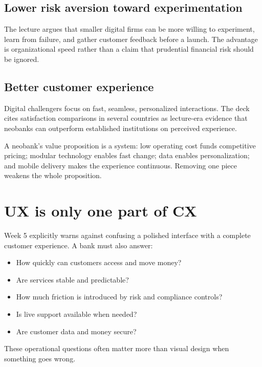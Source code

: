 \subsection{Lower risk aversion toward experimentation}

The lecture argues that smaller digital firms can be more willing to experiment, learn from failure, and gather customer feedback before a launch. The advantage is organizational speed rather than a claim that prudential financial risk should be ignored.

\subsection{Better customer experience}

Digital challengers focus on fast, seamless, personalized interactions. The deck cites satisfaction comparisons in several countries as lecture-era evidence that neobanks can outperform established institutions on perceived experience.

\begin{keyidea}
A neobank's value proposition is a system: low operating cost funds competitive pricing; modular technology enables fast change; data enables personalization; and mobile delivery makes the experience continuous. Removing one piece weakens the whole proposition.
\end{keyidea}

\section{UX is only one part of CX}

Week 5 explicitly warns against confusing a polished interface with a complete customer experience. A bank must also answer:

\begin{itemize}
  \item How quickly can customers access and move money?
  \item Are services stable and predictable?
  \item How much friction is introduced by risk and compliance controls?
  \item Is live support available when needed?
  \item Are customer data and money secure?
\end{itemize}

These operational questions often matter more than visual design when something goes wrong.

